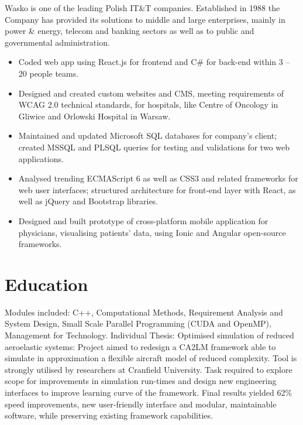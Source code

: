 \documentclass[12pt,english]{resume}
\begin{document}
		Wasko is one of the leading Polish IT\&T companies. Established in 1988 the Company has provided its solutions to middle and large enterprises, mainly in power \& energy, telecom and banking sectors as well as to public and governmental administration.
		\begin{itemize}
			\item Coded web app using React.js for frontend and C\# for back-end within 3 – 20 people teams.
			\item Designed and created custom websites and CMS, meeting requirements of WCAG 2.0 technical standards, for hospitals, like Centre of Oncology in Gliwice and Orlowski Hospital in Warsaw.
			\item Maintained and updated Microsoft SQL databases for company’s client; created MSSQL and PLSQL queries for testing and validations for two web applications.
			\item Analysed trending ECMAScript 6 as well as CSS3 and related frameworks for web user interfaces; structured architecture for front-end layer with React, as well as jQuery and Bootstrap libraries.
			\item Designed and built prototype of cross-platform mobile application for physicians, visualising patients’ data, using Ionic and Angular open-source frameworks.
		\end{itemize}
	
	\section{Education}

			Modules included: C++, Computational Methods, Requirement Analysis and System Design, Small Scale Parallel Programming (CUDA and OpenMP), Management for Technology.
			Individual Thesis: Optimised simulation of reduced aeroelastic systems:
			Project aimed to redesign a CA2LM framework able to simulate in approximation a flexible aircraft model of reduced complexity. Tool is strongly utilised by researchers at Cranfield University. Task required to explore scope for improvements in simulation run-times and design new engineering interfaces to improve learning curve of the framework. Final results yielded 62\% speed improvements, new user-friendly interface and modular, maintainable software, while preserving existing framework capabilities.
\end{document}
